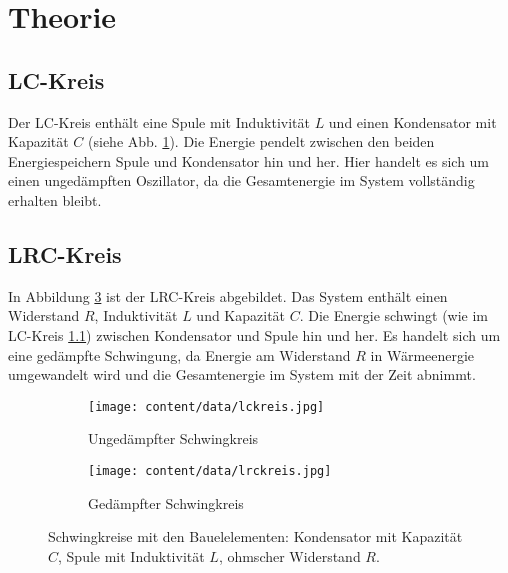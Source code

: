 \section{Theorie}
\label{sec:Theorie}

\subsection{LC-Kreis}
\label{sec:lckreis}
Der LC-Kreis enthält eine Spule mit Induktivität $L$ und einen Kondensator mit Kapazität $C$ (siehe Abb. \ref{fig:lckreis}).
Die Energie pendelt zwischen den beiden Energiespeichern Spule und Kondensator hin und her.
Hier handelt es sich um einen ungedämpften Oszillator, da die Gesamtenergie im System vollständig erhalten bleibt.

\subsection{LRC-Kreis}
In Abbildung \ref{fig:lrckreis} ist der LRC-Kreis abgebildet.
Das System enthält einen Widerstand $R$, Induktivität $L$ und Kapazität $C$.
Die Energie schwingt (wie im LC-Kreis \ref{sec:lckreis}) zwischen Kondensator und Spule hin und her.
Es handelt sich um eine gedämpfte Schwingung, da Energie am Widerstand $R$ in Wärmeenergie umgewandelt wird und die Gesamtenergie im System mit der Zeit abnimmt.

\begin{figure}
    \centering
    \begin{subfigure}{0.48\textwidth}
        \centering
        \texttt{[image: content/data/lckreis.jpg]}
        \caption{Ungedämpfter Schwingkreis}
        \label{fig:lckreis}
    \end{subfigure}
    \begin{subfigure}{0.48\textwidth}
        \centering
        \texttt{[image: content/data/lrckreis.jpg]}
        \caption{Gedämpfter Schwingkreis} 
        \label{fig:lrckreis}
    \end{subfigure}
    \caption{Schwingkreise mit den Bauelelementen: Kondensator mit Kapazität $C$, Spule mit Induktivität $L$, ohmscher Widerstand $R$.}
\end{figure}